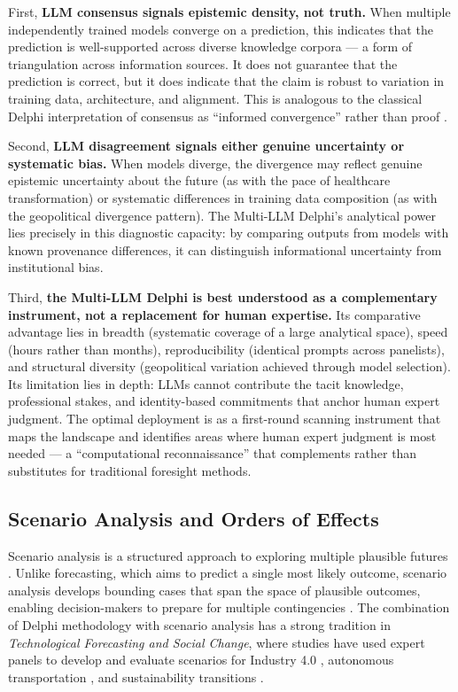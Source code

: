 \documentclass[preprint,review,12pt]{elsarticle}
\begin{document}
First, \textbf{LLM consensus signals epistemic density, not truth.} When multiple independently trained models converge on a prediction, this indicates that the prediction is well-supported across diverse knowledge corpora --- a form of triangulation across information sources. It does not guarantee that the prediction is correct, but it does indicate that the claim is robust to variation in training data, architecture, and alignment. This is analogous to the classical Delphi interpretation of consensus as ``informed convergence'' rather than proof \citep{linstone1975delphi}.

Second, \textbf{LLM disagreement signals either genuine uncertainty or systematic bias.} When models diverge, the divergence may reflect genuine epistemic uncertainty about the future (as with the pace of healthcare transformation) or systematic differences in training data composition (as with the geopolitical divergence pattern). The Multi-LLM Delphi's analytical power lies precisely in this diagnostic capacity: by comparing outputs from models with known provenance differences, it can distinguish informational uncertainty from institutional bias.

Third, \textbf{the Multi-LLM Delphi is best understood as a complementary instrument, not a replacement for human expertise.} Its comparative advantage lies in breadth (systematic coverage of a large analytical space), speed (hours rather than months), reproducibility (identical prompts across panelists), and structural diversity (geopolitical variation achieved through model selection). Its limitation lies in depth: LLMs cannot contribute the tacit knowledge, professional stakes, and identity-based commitments that anchor human expert judgment. The optimal deployment is as a first-round scanning instrument that maps the landscape and identifies areas where human expert judgment is most needed --- a ``computational reconnaissance'' that complements rather than substitutes for traditional foresight methods.


\subsection{Scenario Analysis and Orders of Effects}
\label{sec:scenario_analysis}

Scenario analysis is a structured approach to exploring multiple plausible futures \citep{vanderheijden1996scenarios, postma2005scenario}. Unlike forecasting, which aims to predict a single most likely outcome, scenario analysis develops bounding cases that span the space of plausible outcomes, enabling decision-makers to prepare for multiple contingencies \citep{banuls2011scenario}. The combination of Delphi methodology with scenario analysis has a strong tradition in \textit{Technological Forecasting and Social Change}, where studies have used expert panels to develop and evaluate scenarios for Industry 4.0 \citep{culot2020manufacturing}, autonomous transportation \citep{fritschy2019autonomous}, and sustainability transitions \citep{geels2020scenarios}.
\end{document}
